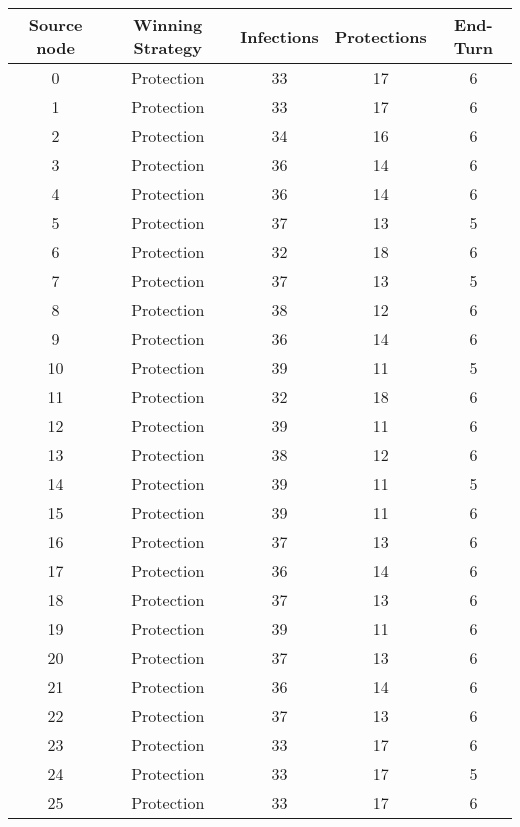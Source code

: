 \documentclass[results.tex]{subfiles}
\begin{document}
\begin{center}
  \begin{tabular}{| c || c | c | c | c |}
    \hline
    {\bfseries Source node} & {\bfseries Winning Strategy} & {\bfseries Infections} & {\bfseries Protections} & {\bfseries End-Turn} \\  %
    \hline\hline
    0 & Protection & 33 & 17 & 6 \\ 
    \hline
    1 & Protection & 33 & 17 & 6 \\ 
    \hline
    2 & Protection & 34 & 16 & 6 \\ 
    \hline
    3 & Protection & 36 & 14 & 6 \\ 
    \hline
    4 & Protection & 36 & 14 & 6 \\ 
    \hline
    5 & Protection & 37 & 13 & 5 \\ 
    \hline
    6 & Protection & 32 & 18 & 6 \\ 
    \hline
    7 & Protection & 37 & 13 & 5 \\ 
    \hline
    8 & Protection & 38 & 12 & 6 \\ 
    \hline
    9 & Protection & 36 & 14 & 6 \\ 
    \hline
    10 & Protection & 39 & 11 & 5 \\ 
    \hline
    11 & Protection & 32 & 18 & 6 \\ 
    \hline
    12 & Protection & 39 & 11 & 6 \\ 
    \hline
    13 & Protection & 38 & 12 & 6 \\ 
    \hline
    14 & Protection & 39 & 11 & 5 \\ 
    \hline
    15 & Protection & 39 & 11 & 6 \\ 
    \hline
    16 & Protection & 37 & 13 & 6 \\ 
    \hline
    17 & Protection & 36 & 14 & 6 \\ 
    \hline
    18 & Protection & 37 & 13 & 6 \\ 
    \hline
    19 & Protection & 39 & 11 & 6 \\ 
    \hline
    20 & Protection & 37 & 13 & 6 \\ 
    \hline
    21 & Protection & 36 & 14 & 6 \\ 
    \hline
    22 & Protection & 37 & 13 & 6 \\ 
    \hline
    23 & Protection & 33 & 17 & 6 \\ 
    \hline
    24 & Protection & 33 & 17 & 5 \\ 
    \hline
    25 & Protection & 33 & 17 & 6 \\ 

\end{tabular}
\end{center}
\end{document}
